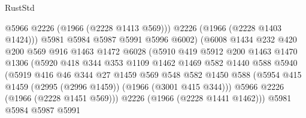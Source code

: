 \begin{lexlean}{RustStd}
\begin{coremodule}
                                  @5966
                                  @2226
                                  (@1966 (@2228 @1413 @569)))
                                @2226
                                (@1966 (@2228 @1403 @1424)))
                              @5981
                              @5984
                              @5987
                              @5991
                              @5996
                              @6002)
                            (@6008
                              @1434
                              @232
                              @420
                              @200
                              @569
                              @916
                              @1463
                              @1472
                              @6028
                              (@5910
                                @419
                                @5912
                                @200
                                @1463
                                @1470
                                @1306
                                (@5920
                                  @418
                                  @344
                                  @353
                                  @1109
                                  @1462
                                  @1469
                                  @582
                                  @1440
                                  @588
                                  @5940
                                  (@5919
                                    @416
                                    @46
                                    @344
                                    @27
                                    @1459
                                    @569
                                    @548
                                    @582
                                    @1450
                                    @588
                                    (@5954
                                      @415
                                      @1459
                                      (@2995 (@2996 @1459))
                                      (@1966 (@3001 @415 @344)))
                                    @5966
                                    @2226
                                    (@1966 (@2228 @1451 @569)))
                                  @2226
                                  (@1966 (@2228 @1441 @1462)))
                                @5981
                                @5984
                                @5987
                                @5991

\end{coremodule}
\end{lexlean}

